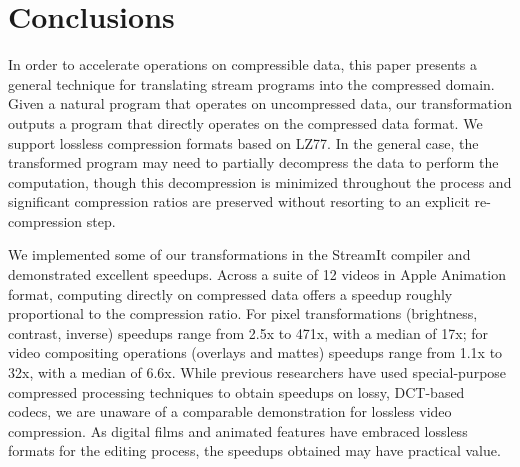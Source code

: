 \section{Conclusions}
\label{sec:conclusions}


In order to accelerate operations on compressible data, this paper
presents a general technique for translating stream programs into the
compressed domain.  Given a natural program that operates on
uncompressed data, our transformation outputs a program that directly
operates on the compressed data format.  We support lossless
compression formats based on LZ77.  In the general case, the
transformed program may need to partially decompress the data to
perform the computation, though this decompression is minimized
throughout the process and significant compression ratios are
preserved without resorting to an explicit re-compression step.


We implemented some of our transformations in the StreamIt compiler
and demonstrated excellent speedups.  Across a suite of 12 videos in
Apple Animation format, computing directly on compressed data offers a
speedup roughly proportional to the compression ratio.  For pixel
transformations (brightness, contrast, inverse) speedups range from
2.5x to 471x, with a median of 17x; for video compositing operations
(overlays and mattes) speedups range from 1.1x to 32x, with a median
of 6.6x.  While previous researchers have used special-purpose
compressed processing techniques to obtain speedups on lossy,
DCT-based codecs, we are unaware of a comparable demonstration for
lossless video compression.  As digital films and animated features
have embraced lossless formats for the editing process, the speedups
obtained may have practical value.
